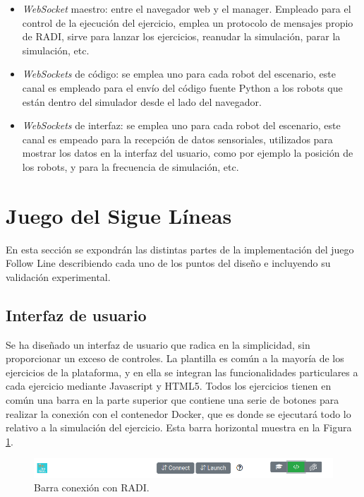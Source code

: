 \documentclass[a4paper, 12pt]{book}
\begin{document}
\begin{itemize}
\item \emph{WebSocket} maestro: entre el navegador web y el manager. Empleado para el control de la ejecución del ejercicio, emplea un protocolo de mensajes propio de RADI, sirve para lanzar los ejercicios, reanudar la simulación, parar la simulación, etc.
\item \emph{WebSockets} de código: se emplea uno para cada robot del escenario, este canal es empleado para el envío del código fuente Python a los robots que están dentro del simulador desde el lado del navegador.
\item \emph{WebSockets} de interfaz: se emplea uno para cada robot del escenario, este canal es empeado para la recepción de datos sensoriales, utilizados para mostrar los datos en la interfaz del usuario, como por ejemplo la posición de los robots, y para la frecuencia de simulación, etc.
\end{itemize}

\section{Juego del Sigue Líneas} 
\label{sec:follow_line_game}

En esta sección se expondrán las distintas partes de la implementación del juego Follow Line describiendo cada uno de los puntos del diseño e incluyendo su validación experimental.

\subsection{Interfaz de usuario}

Se ha diseñado un interfaz de usuario que radica en la simplicidad, sin proporcionar un exceso de controles. La plantilla es común a la mayoría de los ejercicios de la plataforma, y en ella se integran las funcionalidades particulares a cada ejercicio mediante Javascript y HTML5. Todos los ejercicios tienen en común una barra en la parte superior que contiene una serie de botones para realizar la conexión con el contenedor Docker, que es donde se ejecutará todo lo relativo a la simulación del ejercicio. Esta barra horizontal muestra en la Figura \ref{figura:conexion_radi}.

\begin{figure}[H]
	\centering
    \includegraphics[width=15cm]{img/barra_radi.png}
    \caption{Barra conexión con RADI.}
    \label{figura:conexion_radi}
\end{figure}
\end{document}
